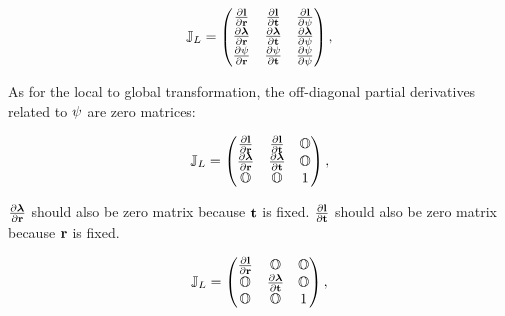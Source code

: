\documentclass[12pt,a4paper]{scrarticle}
\begin{document}
\begin{equation}\label{eq:jacobi3}
    \mathbb{J}_{L} = 
    \begin{pmatrix}
     \frac{\partial{\mathbf{l}}}{\partial{\mathbf{r}}} & 
     \frac{\partial{\mathbf{l}}}{\partial{\mathbf{t}}}&  \frac{\partial{\mathbf{l}}}{\partial{\psi}} \\
     \frac{\partial{\boldsymbol{\lambda}}}{\partial{\mathbf{r}}} & 
     \frac{\partial{\boldsymbol{\lambda}}}{\partial{\mathbf{t}}}&  \frac{\partial{\boldsymbol{\lambda}}}{\partial{\psi}} \\
     \frac{\partial{\psi}}{\partial{\mathbf{r}}} & 
     \frac{\partial{\psi}}{\partial{\mathbf{t}}}&  \frac{\partial{\psi}}{\partial{\psi}}
    \end{pmatrix},
\end{equation}

As for the local to global transformation, the off-diagonal partial derivatives related to $\psi$ are zero matrices:

\begin{equation}\label{eq:jacobi4}
    \mathbb{J}_{L} = 
    \begin{pmatrix}
     \frac{\partial{\mathbf{l}}}{\partial{\mathbf{r}}} & 
     \frac{\partial{\mathbf{l}}}{\partial{\mathbf{t}}}&  \mathbb{O} \\
     \frac{\partial{\boldsymbol{\lambda}}}{\partial{\mathbf{r}}} & 
     \frac{\partial{\boldsymbol{\lambda}}}{\partial{\mathbf{t}}}&  \mathbb{O} \\
     \mathbb{O} & 
     \mathbb{O} &  1
    \end{pmatrix},
\end{equation}

$\frac{\partial{\boldsymbol{\lambda}}}{\partial{\mathbf{r}}}$ should also be zero matrix because $\mathbf{t}$ is fixed. $\frac{\partial{\mathbf{l}}}{\partial{\mathbf{t}}}$ should also be zero matrix because $\mathbf{r}$ is fixed. 

\begin{equation}\label{eq:jacobi5}
    \mathbb{J}_{L} = 
    \begin{pmatrix}
     \frac{\partial{\mathbf{l}}}{\partial{\mathbf{r}}} & \mathbb{O} &  \mathbb{O} \\
     \mathbb{O} & \frac{\partial{\boldsymbol{\lambda}}}{\partial{\mathbf{t}}} &  \mathbb{O} \\
     \mathbb{O} & \mathbb{O} & 1
    \end{pmatrix},
\end{equation}
\end{document}
